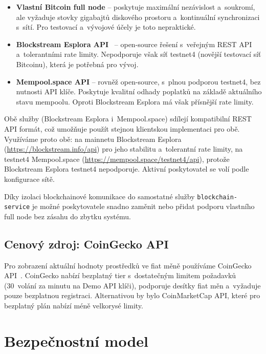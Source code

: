 \begin{itemize}
\item \textbf{Vlastní Bitcoin full node} -- poskytuje maximální nezávislost
  a~soukromí, ale vyžaduje stovky gigabajtů diskového prostoru a~kontinuální
  synchronizaci s~sítí. Pro testovací a~vývojové účely je toto nepraktické.
\item \textbf{Blockstream Esplora API}~\cite{BlockstreamEsplora} -- open-source
  řešení s~veřejným REST API a~tolerantními rate limity. Nepodporuje však síť testnet4
  (novější testovací síť Bitcoinu), která je potřebná pro vývoj.
\item \textbf{Mempool.space API} -- rovněž open-source, s~plnou podporou
  testnet4, bez nutnosti API klíče. Poskytuje kvalitní odhady poplatků
  na základě aktuálního stavu mempoolu. Oproti Blockstream Esplora má
  však přísnější rate limity.
\end{itemize}

Obě služby (Blockstream Esplora i~Mempool.space) sdílejí kompatibilní
REST API formát, což umožňuje použít stejnou klientskou implementaci
pro obě. Využíváme proto obě: na mainnetu Blockstream Esplora~\cite{BlockstreamEsplora}
(\url{https://blockstream.info/api}) pro jeho stabilitu a~tolerantní
rate limity, na testnet4 Mempool.space
(\url{https://mempool.space/testnet4/api}), protože Blockstream Esplora
testnet4 nepodporuje. Aktivní poskytovatel se volí podle konfigurace sítě.

Díky izolaci blockchainové komunikace do samostatné služby
\texttt{blockchain-\allowbreak service} je možné poskytovatele snadno
zaměnit nebo přidat podporu vlastního full node bez zásahu do zbytku systému.

\subsection{Cenový zdroj: CoinGecko API}

Pro zobrazení aktuální hodnoty prostředků ve fiat měně používáme
CoinGecko API~\cite{CoinGeckoAPI}. CoinGecko nabízí bezplatný tier
s~dostatečným limitem požadavků (30~volání za minutu na Demo API
klíči), podporuje desítky fiat měn a~vyžaduje pouze bezplatnou
registraci. Alternativou by bylo CoinMarketCap API, které pro
bezplatný plán nabízí méně velkorysé limity.

\section{Bezpečnostní model}
\label{sec:bezpecnost}

